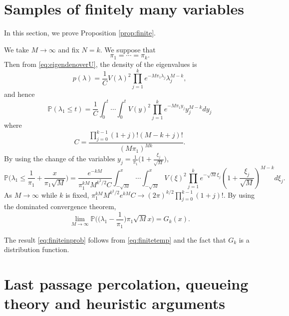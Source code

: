 \documentclass[11pt]{article}
\begin{document}
\section{Samples of finitely many variables}\label{sec:finite}

In this section, we prove Proposition \ref{prop:finite}.

We take $M\to\infty$ and fix $N=k$. We suppose that
\begin{equation}
  \pi_1=\cdots=\pi_k.
\end{equation}
Then from \eqref{eq:eigendenoverU}, the density of the eigenvalues
is
\begin{equation}
  p(\lambda) = \frac1{C} V(\lambda)^2 \prod_{j=1}^k e^{-M\pi_1
  \lambda_j} \lambda_j^{M-k},
\end{equation}
and hence
\begin{equation}
  \mathbb{P}(\lambda_1\le t) = \frac1{C} \int_0^{t} \cdots \int_0^{t}
  V(y)^2 \prod_{j=1}^k e^{-M\pi_1
  y_j} y_j^{M-k} dy_j
\end{equation}
where %
\begin{equation}
  C= \frac{\prod_{j=0}^{k-1} (1+j)!(M-k+j)!}{(M\pi_1)^{Mk}}.
\end{equation}
By using the change of the
variables $y_j=\frac1{\pi_1}\bigl( 1+\frac{\xi_j}{\sqrt{M}}
\bigr)$,
\begin{equation}
  \mathbb{P} \biggl( \lambda_1\le \frac1{\pi_1}+ \frac{x}{\pi_1\sqrt{M}}
  \biggr)
  = \frac{e^{-kM}}{\pi_1^{kM}M^{k^2/2} C} \int_{-\sqrt{M}}^x\cdots \int_{-\sqrt{M}}^x V(\xi)^2
  \prod_{j=1}^k e^{-\sqrt{M}\xi_j}
  (1+\frac{\xi_j}{\sqrt{M}})^{M-k}
  d\xi_j .
\end{equation}
As $M\to\infty$ while $k$ is fixed, $\pi_1^{kM}M^{k^2/2}e^{kM} C
\to (2\pi)^{k/2}\prod_{j=0}^{k-1} (1+j)!$. By using the dominated
convergence theorem,
\begin{equation}\label{eq:finitetemp}
  \lim_{M\to\infty} \mathbb{P} \biggl( \bigl(\lambda_1-\frac1{\pi_1}
  \bigr) \pi_1\sqrt{M} x\biggr) = G_k(x).
\end{equation}

The result \eqref{eq:finiteinprob} follows from
\eqref{eq:finitetemp} and the fact that $G_k$ is a distribution
function.



\section{Last passage percolation, queueing theory
and heuristic arguments}\label{sec:last}
\end{document}
